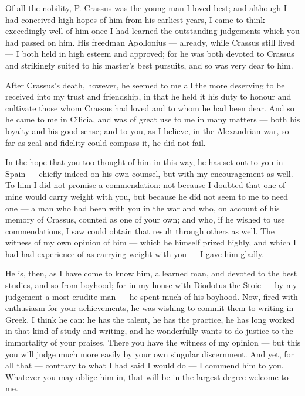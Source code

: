 

 Of all the nobility, P. Crassus was the young man I loved best; and although I had conceived high hopes of him from his earliest years, I came to think exceedingly well of him once I had learned the outstanding judgements which you had passed on him. His freedman Apollonius --- already, while Crassus still lived --- I both held in high esteem and approved; for he was both devoted to Crassus and strikingly suited to his master's best pursuits, and so was very dear to him.

 After Crassus's death, however, he seemed to me all the more deserving to be received into my trust and friendship, in that he held it his duty to honour and cultivate those whom Crassus had loved and to whom he had been dear. And so he came to me in Cilicia, and was of great use to me in many matters --- both his loyalty and his good sense; and to you, as I believe, in the Alexandrian war, so far as zeal and fidelity could compass it, he did not fail.

 In the hope that you too thought of him in this way, he has set out to you in Spain --- chiefly indeed on his own counsel, but with my encouragement as well. To him I did not promise a commendation: not because I doubted that one of mine would carry weight with you, but because he did not seem to me to need one --- a man who had been with you in the war and who, on account of his memory of Crassus, counted as one of your own; and who, if he wished to use commendations, I saw could obtain that result through others as well. The witness of my own opinion of him --- which he himself prized highly, and which I had had experience of as carrying weight with you --- I gave him gladly.

 He is, then, as I have come to know him, a learned man, and devoted to the best studies, and so from boyhood; for in my house with Diodotus the Stoic --- by my judgement a most erudite man --- he spent much of his boyhood. Now, fired with enthusiasm for your achievements, he was wishing to commit them to writing in Greek. I think he can: he has the talent, he has the practice, he has long worked in that kind of study and writing, and he wonderfully wants to do justice to the immortality of your praises. There you have the witness of my opinion --- but this you will judge much more easily by your own singular discernment. And yet, for all that --- contrary to what I had said I would do --- I commend him to you. Whatever you may oblige him in, that will be in the largest degree welcome to me.
